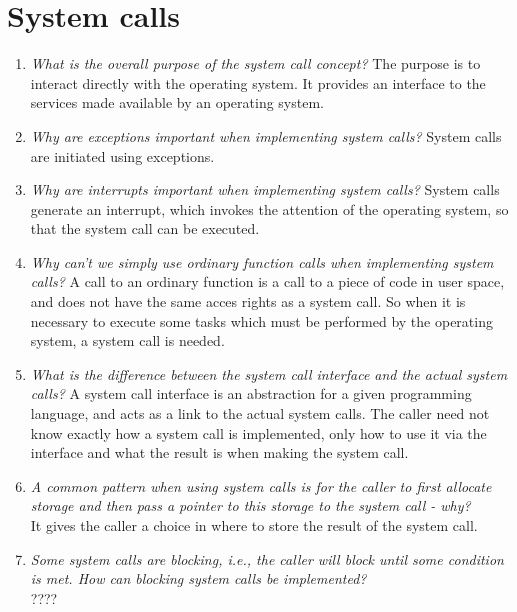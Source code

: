 \documentclass[a4paper]{article}
\begin{document}
\section{System calls}
\begin{enumerate}
  \item \textit{What is the overall purpose of the system call concept? }
    The purpose is to interact directly with the operating system. It provides an interface to the services made available by an operating system.
  \item \textit{Why are exceptions important when implementing system calls?}
    System calls are initiated using exceptions. 
  \item \textit{Why are interrupts important when implementing system calls?}
    System calls generate an interrupt, which invokes the attention of the operating system, so that the system call can be executed.
  \item \textit{Why can't we simply use ordinary function calls when implementing system calls?}
    A call to an ordinary function is a call to a piece of code in user space, and does not have the same acces rights as a system call. So when it is necessary to execute some tasks which must be performed by the operating system, a system call is needed.
  \item \textit{What is the difference between the system call interface and the actual system calls?}
    A system call interface is an abstraction for a given programming language, and acts as a link to the actual system calls. The caller need not know exactly how a system call is implemented, only how to use it via the interface and what the result is when making the system call.
  \item \textit{A common pattern when using system calls is for the caller to first allocate storage and then pass a pointer to this storage to the system call - why? } \\ 
    It gives the caller a choice in where to store the result of the system call.
  \item \textit{Some system calls are blocking, i.e., the caller will block until some condition is met. How can blocking system calls be implemented?} \\
    {\color{red} ????}
  
\end{enumerate}
\end{document}
